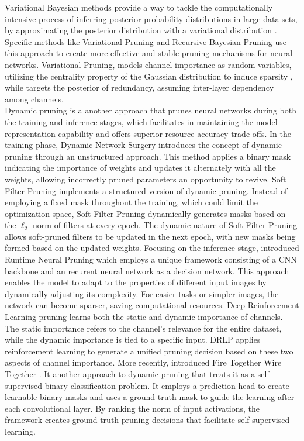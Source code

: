 Variational Bayesian methods provide a way to tackle the computationally
intensive process of inferring posterior probability distributions in large data
sets, by approximating the posterior distribution with a variational
distribution \cite{fox2012tutorial}. Specific methods like Variational Pruning
\cite{DBLP:conf/cvpr/ZhaoNZZZT19} and Recursive Bayesian Pruning
\cite{DBLP:conf/iccv/Zhou0W019} use this approach to create more effective and
stable pruning mechanisms for neural networks. Variational Pruning, models
channel importance as random variables, utilizing the centrality property of the
Gaussian distribution to induce sparsity \cite{DBLP:conf/cvpr/ZhaoNZZZT19},
while \cite{DBLP:conf/iccv/Zhou0W019} targets the posterior of redundancy,
assuming inter-layer dependency among channels.\\


Dynamic pruning is a another approach that prunes neural networks during both
the training and inference stages, which facilitates in maintaining the model
representation capability and offers superior resource-accuracy trade-offs. In
the training phase, Dynamic Network Surgery \cite{DBLP:conf/nips/GuoYC16}
introduces the concept of dynamic pruning through an unstructured approach. This
method applies a binary mask indicating the importance of weights and updates it
alternately with all the weights, allowing incorrectly pruned parameters an
opportunity to revive. Soft Filter Pruning \cite{DBLP:conf/ijcai/HeKDFY18}
implements a structured version of dynamic pruning. Instead of employing a fixed
mask throughout the training, which could limit the optimization space, Soft
Filter Pruning dynamically generates masks based on the $\ell_2$ norm of filters
at every epoch. The dynamic nature of Soft Filter Pruning allows soft-pruned
filters to be updated in the next epoch, with new masks being formed based on
the updated weights. Focusing on the inference stage,
\citeauthor{DBLP:conf/nips/LinRLZ17} introduced Runtime Neural Pruning
\cite{DBLP:conf/nips/LinRLZ17} which employs a unique framework consisting of a
\ac{CNN} backbone and an recurent neural network as a decision network. This
approach enables the model to adapt to the properties of different input images
by dynamically adjusting its complexity. For easier tasks or simpler images, the
network can become sparser, saving computational resources. Deep Reinforcement
Learning pruning \cite{DBLP:conf/nips/ChenCP20} learns both the static and
dynamic importance of channels. The static importance refers to the channel's
relevance for the entire dataset, while the dynamic importance is tied to a
specific input. DRLP applies reinforcement learning to generate a unified
pruning decision based on these two aspects of channel importance. More
recently, \citeauthor{DBLP:conf/cvpr/ElkerdawyE0R22} introduced Fire Together
Wire Together \cite{DBLP:conf/cvpr/ElkerdawyE0R22}. It another approach to
dynamic pruning that treats it as a self-supervised binary classification
problem. It employs a prediction head to create learnable binary masks and uses
a ground truth mask to guide the learning after each convolutional layer. By
ranking the norm of input activations, the framework creates ground truth
pruning decisions that facilitate self-supervised learning. \\

